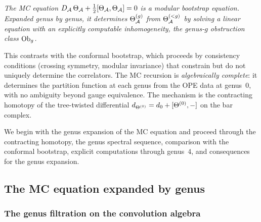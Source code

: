 \begin{center}
\emph{The MC equation $D_{\mathcal{A}}\,\Theta_{\mathcal{A}}
+ \tfrac{1}{2}[\Theta_{\mathcal{A}},\Theta_{\mathcal{A}}] = 0$
is a modular bootstrap equation. Expanded genus by genus,
it determines $\Theta^{(g)}_{\mathcal{A}}$ from $\Theta^{(<g)}_{\mathcal{A}}$
by solving a linear equation with an explicitly computable
inhomogeneity, the genus-$g$ obstruction class $\mathrm{Ob}_g$.}
\end{center}

This contrasts with the conformal bootstrap, which proceeds
by consistency conditions (crossing symmetry, modular invariance)
that constrain but do not uniquely determine the correlators.
The MC recursion is \emph{algebraically complete}: it determines
the partition function at each genus from the OPE data at
genus~$0$, with no ambiguity beyond gauge equivalence. The
mechanism is the contracting homotopy of the tree-twisted
differential $d_{\Theta^{(0)}} = d_0 + [\Theta^{(0)}, -]$
on the bar complex.

We begin with the genus expansion of the MC equation and
proceed through the contracting homotopy, the genus spectral
sequence, comparison with the conformal bootstrap, explicit
computations through genus~$4$, and consequences for the genus
expansion.

%
%

\subsection{The MC equation expanded by genus}
\label{subsec:thqg-VII-mc-genus-expansion}

\subsubsection{The genus filtration on the convolution algebra}
\label{subsubsec:thqg-VII-genus-filtration}

